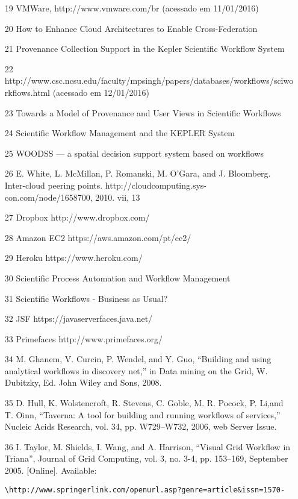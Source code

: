 \documentclass[engenharia]{UnB-CIC}%
\begin{document}
\begin{itemize}
    \item [19] VMWare, http://www.vmware.com/br (acessado em 11/01/2016)
    \item [20] How to Enhance Cloud Architectures to Enable Cross-Federation
    \item [21] Provenance Collection Support in the Kepler Scientific Workflow System
    \item [22] http://www.csc.ncsu.edu/faculty/mpsingh/papers/databases/workflows/sciworkflows.html (acessado em 12/01/2016)	
    \item [23] Towards a Model of Provenance and User Views in Scientific Workflows	
    \item [24] Scientific Workflow Management and the KEPLER System	
    \item [25] WOODSS — a spatial decision support system based on workflows	
    \item [26] E. White, L. McMillan, P. Romanski, M. O'Gara, and J. Bloomberg. Inter-cloud peering points. http://cloudcomputing.sys-con.com/node/1658700, 2010. vii, 13
    \item [27] Dropbox http://www.dropbox.com/
    \item [28] Amazon EC2 https://aws.amazon.com/pt/ec2/
    \item [29] Heroku https://www.heroku.com/
    \item [30] Scientific Process Automation and Workflow Management
    \item [31] Scientific Workflows - Business as Usual?
    \item [32] JSF https://javaserverfaces.java.net/
    \item [33] Primefaces http://www.primefaces.org/
    \item [34] M. Ghanem, V. Curcin, P. Wendel, and Y. Guo, “Building and using analytical workflows in discovery net,” in Data mining on the Grid, W. Dubitzky, Ed. John Wiley and Sons, 2008.
    \item [35] D. Hull, K. Wolstencroft, R. Stevens, C. Goble, M. R. Pocock, P. Li,and T. Oinn, “Taverna: A tool for building and running workflows of services,” Nucleic Acids Research, vol. 34, pp. W729–W732, 2006, web Server Issue.
	\item [36] I. Taylor, M. Shields, I. Wang, and A. Harrison, “Visual Grid Workflow in Triana”, Journal of Grid Computing, vol. 3, no. 3-4, pp. 153–169, September 2005. [Online]. Available:
\begin{verbatim}
\http://www.springerlink.com/openurl.asp?genre=article&issn=1570- 

\end{verbatim}
\end{itemize}
\end{document}
